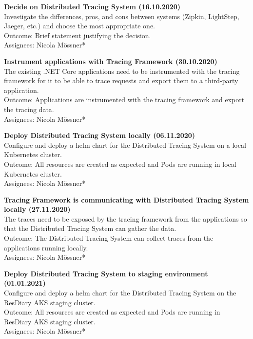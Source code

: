 \documentclass[11pt]{article}
\begin{document}
\textbf{Decide on Distributed Tracing System (16.10.2020)}\\
Investigate the differences, pros, and cons between systems (Zipkin, LightStep, Jaeger, etc.) and choose the most appropriate one.\\
Outcome: Brief statement justifying the decision.\\
Assignees: Nicola M\"{o}ssner*

\textbf{Instrument applications with Tracing Framework (30.10.2020)}\\
The existing .NET Core applications need to be instrumented with the tracing framework for it to be able to trace requests and export them to a third-party application.\\
Outcome: Applications are instrumented with the tracing framework and export the tracing data.\\
Assignees: Nicola M\"{o}ssner*

\textbf{Deploy Distributed Tracing System locally (06.11.2020)}\\
Configure and deploy a helm chart for the Distributed Tracing System on a local Kubernetes cluster.\\
Outcome: All resources are created as expected and Pods are running in local Kubernetes cluster.\\
Assignees: Nicola M\"{o}ssner*

\textbf{Tracing Framework is communicating with Distributed Tracing System locally (27.11.2020)}\\
The traces need to be exposed by the tracing framework from the applications so that the Distributed Tracing System can gather the data.\\
Outcome: The Distributed Tracing System can collect traces from the applications running locally.\\
Assignees: Nicola M\"{o}ssner*

\textbf{Deploy Distributed Tracing System to staging environment (01.01.2021)}\\
Configure and deploy a helm chart for the Distributed Tracing System on the ResDiary AKS staging cluster.\\
Outcome: All resources are created as expected and Pods are running in ResDiary AKS staging cluster.\\
Assignees: Nicola M\"{o}ssner*
\end{document}

